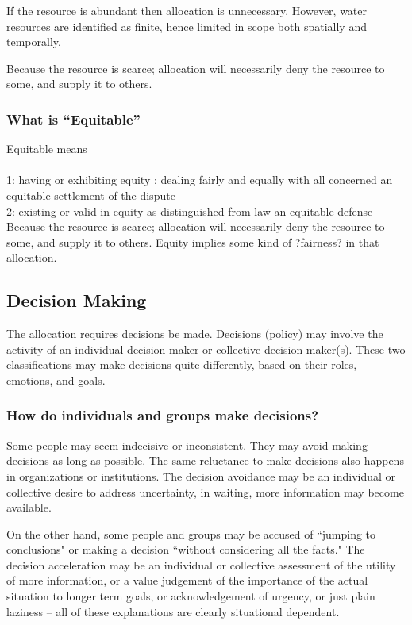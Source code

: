 If the resource is abundant then allocation is unnecessary.  
However, water resources are identified as finite, hence limited in scope both spatially and temporally.

Because the resource is scarce; allocation will necessarily deny the resource to some, and supply it to others.

\subsubsection{What is ``Equitable''}
Equitable means \\~\\
1: having or exhibiting equity : dealing fairly and equally with all concerned an
equitable settlement of the dispute \\
2: existing or valid in equity as distinguished from law an equitable defense\\

Because the resource is scarce; allocation will necessarily deny the resource
to some, and supply it to others. 
Equity implies some kind of ?fairness? in that allocation.

\subsection{Decision Making}
The allocation requires decisions be made.
Decisions (policy) may involve the activity of an individual decision maker or collective decision maker(s).
These two classifications may make decisions quite differently, based on their roles, emotions, and goals.

\subsubsection{How do individuals and groups make decisions?}
Some people may seem indecisive or inconsistent. 
They may avoid making decisions as long as possible.
The same reluctance to make decisions also happens in organizations or institutions.
The decision avoidance may be an individual or collective desire to address uncertainty, in waiting, more information may become available.

On the other hand, some people and groups may be accused of ``jumping to conclusions" or making a decision ``without considering all the facts."
The decision acceleration may be an individual or collective assessment of the utility of more information, or a value judgement of the importance of the actual situation to longer term goals, or acknowledgement of urgency, or just plain laziness -- all of these explanations are clearly situational dependent.

